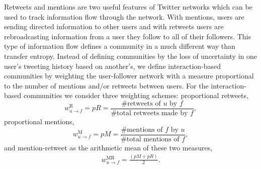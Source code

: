Retweets and mentions are two useful features of Twitter networks which can be used to track information flow through the network.
With mentions, users are sending directed information to other users and with retweets users are rebroadcasting information from a user they follow to all of their followers. 
This type of information flow defines a community in a much different way than transfer entropy. Instead of defining communities by the loss of uncertainty in one user's tweeting history based on another's, we define interaction-based communities by weighting the user-follower network with a measure proportional to the number of mentions and/or retweets between users. 
For the interaction-based communities we consider three weighting schemes: proportional retweets,
\begin{equation}
w_{u \to f}^{\text{R}}=pR=\frac{\mbox{\# retweets of }u \mbox{ by }f}{\mbox{\# total retweets made by }f},
\end{equation}
proportional mentions,
\begin{equation}
w_{u \to f}^{\text{M}} = pM = \frac{\mbox{\# mentions of }f \mbox{ by }u}{\mbox{\# total mentions of }f},
\end{equation}
and mention-retweet as the arithmetic mean of these two measures,
\begin{align}
	w_{u \to f}^{\text{MR}} = \frac{(pM+pR)}{2}. \label{Eqn-EW-interaction}
\end{align} 


